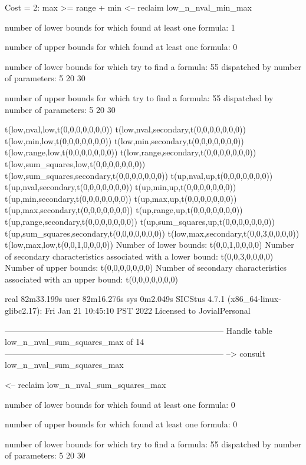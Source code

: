 Cost =  2:  max >= range + min
<-- reclaim low_n_nval_min_max

number of lower bounds for which found at least one formula: 1

number of upper bounds for which found at least one formula: 0

number of lower bounds for which try to find a formula: 55
dispatched by number of parameters: 5  20  30

number of upper bounds for which try to find a formula: 55
dispatched by number of parameters: 5  20  30

t(low,nval,low,t(0,0,0,0,0,0,0))
t(low,nval,secondary,t(0,0,0,0,0,0,0))
t(low,min,low,t(0,0,0,0,0,0,0))
t(low,min,secondary,t(0,0,0,0,0,0,0))
t(low,range,low,t(0,0,0,0,0,0,0))
t(low,range,secondary,t(0,0,0,0,0,0,0))
t(low,sum_squares,low,t(0,0,0,0,0,0,0))
t(low,sum_squares,secondary,t(0,0,0,0,0,0,0))
t(up,nval,up,t(0,0,0,0,0,0,0))
t(up,nval,secondary,t(0,0,0,0,0,0,0))
t(up,min,up,t(0,0,0,0,0,0,0))
t(up,min,secondary,t(0,0,0,0,0,0,0))
t(up,max,up,t(0,0,0,0,0,0,0))
t(up,max,secondary,t(0,0,0,0,0,0,0))
t(up,range,up,t(0,0,0,0,0,0,0))
t(up,range,secondary,t(0,0,0,0,0,0,0))
t(up,sum_squares,up,t(0,0,0,0,0,0,0))
t(up,sum_squares,secondary,t(0,0,0,0,0,0,0))
t(low,max,secondary,t(0,0,3,0,0,0,0))
t(low,max,low,t(0,0,1,0,0,0,0))
Number of lower bounds:                                             t(0,0,1,0,0,0,0)
Number of secondary characteristics associated with a lower bound:  t(0,0,3,0,0,0,0)
Number of upper bounds:                                             t(0,0,0,0,0,0,0)
Number of secondary characteristics associated with an upper bound: t(0,0,0,0,0,0,0)

real	82m33.199s
user	82m16.276s
sys	0m2.049s
SICStus 4.7.1 (x86_64-linux-glibc2.17): Fri Jan 21 10:45:10 PST 2022
Licensed to JovialPersonal


--------------------------------------------------------------------------------
Handle table low_n_nval_sum_squares_max of 14
--------------------------------------------------------------------------------
--> consult low_n_nval_sum_squares_max

<-- reclaim low_n_nval_sum_squares_max

number of lower bounds for which found at least one formula: 0

number of upper bounds for which found at least one formula: 0

number of lower bounds for which try to find a formula: 55
dispatched by number of parameters: 5  20  30

